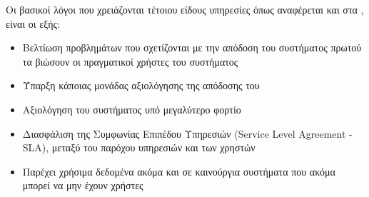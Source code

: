 Οι βασικοί λόγοι που χρειάζονται τέτοιου είδους υπηρεσίες όπως αναφέρεται και στα \cite{web_server_monitoring}, \cite{synthetic_monitoring_using_http_archive}
είναι οι εξής:

\begin{itemize}
	\item Βελτίωση προβλημάτων που σχετίζονται με την απόδοση του συστήματος
		πρωτού τα βιώσουν οι πραγματικοί χρήστες του συστήματος
	\item Ύπαρξη κάποιας μονάδας αξιολόγησης της απόδοσης του
	\item Αξιολόγηση του συστήματος υπό μεγαλύτερο φορτίο
	\item Διασφάλιση της Συμφωνίας Επιπέδου Υπηρεσιών (Service Level Agreement - SLA), μεταξύ
		του παρόχου υπηρεσιών και των χρηστών
	\item Παρέχει χρήσιμα δεδομένα ακόμα και σε καινούργια συστήματα που ακόμα μπορεί να μην έχουν χρήστες   
\end{itemize}
